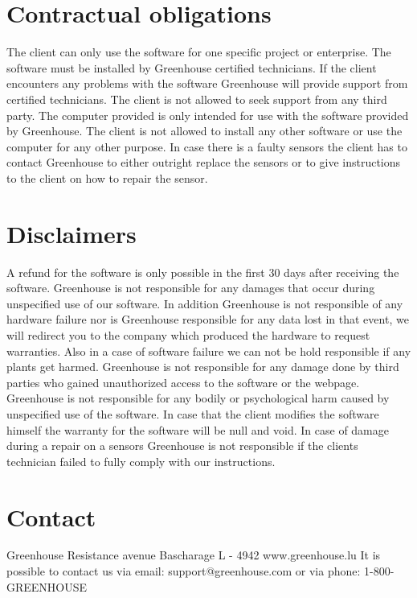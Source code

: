 \section{Contractual obligations}
The client can only use the software for one specific project or enterprise. The
software must be installed by Greenhouse certified technicians. If the client
encounters any problems with the software Greenhouse will provide support from
certified technicians. The client is not allowed to seek support from any third
party. The computer provided is only intended for use with the software provided
by Greenhouse. The client is not allowed to install any other software or use
the computer for any other purpose. In case there is a faulty sensors the client
has to contact Greenhouse to either outright replace the sensors or to give
instructions to the client on how to repair the sensor.

\section{Disclaimers}
A refund for the software is only possible in the first 30 days after receiving
the software. Greenhouse is not responsible for any damages that occur during
unspecified use of our software. In addition Greenhouse is not responsible of
any hardware failure nor is Greenhouse responsible for any data lost in that
event, we will redirect you to the company which produced the hardware to
request warranties. Also in a case of software failure we can not be hold
responsible if any plants get harmed. Greenhouse is not responsible for any
damage done by third parties who gained unauthorized access to the software or
the webpage. Greenhouse is not responsible for any bodily or psychological harm
caused by unspecified use of the software. In case that the client modifies the
software himself the warranty for the software will be null and void. In case of
damage during a repair on a sensors Greenhouse is not responsible if the clients
technician failed to fully comply with our instructions.

\section{Contact}
Greenhouse Resistance avenue \hfill \break
Bascharage L - 4942\hfill \break
www.greenhouse.lu\hfill \break
It is possible to contact us via email: support@greenhouse.com or via phone: 1-800-GREENHOUSE 

